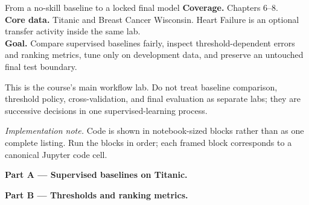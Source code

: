 
\begin{labproject}{From a no-skill baseline to a locked final model}
\textbf{Coverage.} Chapters 6--8.\\
\textbf{Core data.} Titanic and Breast Cancer Wisconsin. Heart Failure is an optional transfer activity inside the same lab.\\
\textbf{Goal.} Compare supervised baselines fairly, inspect threshold-dependent errors and ranking metrics, tune only on development data, and preserve an untouched final test boundary.

\begin{labmode}
This is the course's main workflow lab. Do not treat baseline comparison, threshold policy, cross-validation, and final evaluation as separate labs; they are successive decisions in one supervised-learning process.
\end{labmode}

\smallskip\noindent\textit{Implementation note.} Code is shown in notebook-sized blocks rather than as one complete listing. Run the blocks in order; each framed block corresponds to a canonical Jupyter code cell.\par

\medskip\noindent\textbf{Part A --- Supervised baselines on Titanic.}\par






\medskip\noindent\textbf{Part B --- Thresholds and ranking metrics.}\par








\end{labproject}
